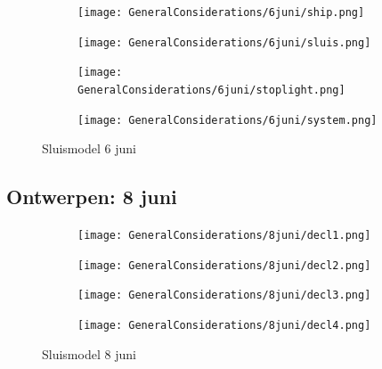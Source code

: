 \documentclass{article}
\begin{document}
	
	
	
	\begin{figure}
		\centering
		\begin{subfigure}{0.45\linewidth}
			\texttt{[image: GeneralConsiderations/6juni/ship.png]}
			\caption{}
			\label{fig:1a}
		\end{subfigure}\hfill
		\begin{subfigure}{0.45\linewidth}
			\texttt{[image: GeneralConsiderations/6juni/sluis.png]}
			\caption{}
			\label{fig:1a}
		\end{subfigure}
		
		\begin{subfigure}{0.45\linewidth}
			\texttt{[image: GeneralConsiderations/6juni/stoplight.png]}
			\caption{}
			\label{fig:1a}
		\end{subfigure}\hfill
		\begin{subfigure}{0.45\linewidth}
			\texttt{[image: GeneralConsiderations/6juni/system.png]}
			\caption{}
			\label{fig:1a}
		\end{subfigure}
		\caption{Sluismodel 6 juni}
		\label{fig:1}
	\end{figure}
	\newpage
	\subsection{Ontwerpen: 8 juni }
	
	
	
	
	\begin{figure}
		\centering
		\begin{subfigure}{0.45\linewidth}
			\texttt{[image: GeneralConsiderations/8juni/decl1.png]}
			\caption{}
			\label{fig:1a}
		\end{subfigure}\hfill
		\begin{subfigure}{0.45\linewidth}
			\texttt{[image: GeneralConsiderations/8juni/decl2.png]}
			\caption{}
			\label{fig:1a}
		\end{subfigure}
		
		\begin{subfigure}{0.45\linewidth}
			\texttt{[image: GeneralConsiderations/8juni/decl3.png]}
			\caption{}
			\label{fig:1a}
		\end{subfigure}\hfill
		\begin{subfigure}{0.45\linewidth}
			\texttt{[image: GeneralConsiderations/8juni/decl4.png]}
			\caption{}
			\label{fig:1a}
		\end{subfigure}
		\caption{Sluismodel 8 juni}
		\label{fig:1}
	\end{figure}
	
\end{document}
